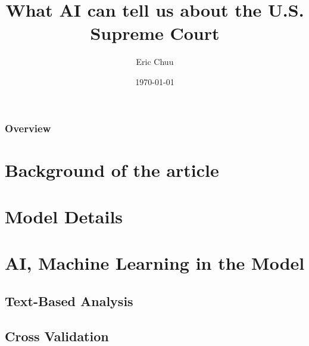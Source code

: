 \documentclass{beamer}
\title[AI and the Supreme Court]{What AI can tell us about the U.S. Supreme Court} %
\author{Eric Chuu} %
\institute[UCLA] %
{
University of California, Los Angeles \\ %
}
\date{\today} %
\begin{document}
\begin{frame}
\titlepage %
\end{frame}

\begin{frame}
\frametitle{Overview} %
\tableofcontents %
\end{frame}


\section{Background of the article}

\section{Model Details} %

\section{AI, Machine Learning in the Model}
\subsection{Text-Based Analysis}
\subsection{Cross Validation}
\end{document}
